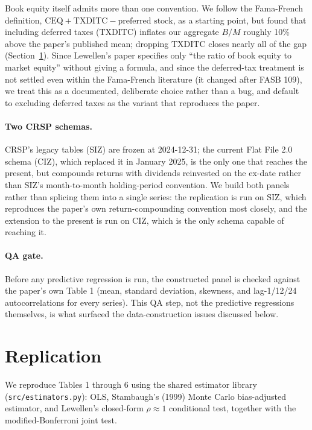 \documentclass[11pt]{article}
\begin{document}
Book equity itself admits more than one convention. We follow the
Fama-French definition, \(\text{CEQ} + \text{TXDITC} - \text{preferred
stock}\), as a starting point, but found that including deferred taxes
(\(\text{TXDITC}\)) inflates our aggregate \(B/M\) roughly 10\% above the
paper's published mean; dropping \(\text{TXDITC}\) closes nearly all of the
gap (Section~\ref{sec:replication}). Since Lewellen's paper specifies only
``the ratio of book equity to market equity'' without giving a formula, and
since the deferred-tax treatment is not settled even within the Fama-French
literature (it changed after FASB 109), we treat this as a documented,
deliberate choice rather than a bug, and default to excluding deferred
taxes as the variant that reproduces the paper.

\paragraph{Two CRSP schemas.} CRSP's legacy tables (SIZ) are frozen at
2024-12-31; the current Flat File 2.0 schema (CIZ), which replaced it in
January 2025, is the only one that reaches the present, but compounds
returns with dividends reinvested on the ex-date rather than SIZ's
month-to-month holding-period convention. We build both panels rather than
splicing them into a single series: the replication is run on SIZ, which
reproduces the paper's own return-compounding convention most closely, and
the extension to the present is run on CIZ, which is the only schema
capable of reaching it.

\paragraph{QA gate.} Before any predictive regression is run, the
constructed panel is checked against the paper's own Table 1 (mean,
standard deviation, skewness, and lag-1/12/24 autocorrelations for every
series). This QA step, not the predictive regressions themselves, is what
surfaced the data-construction issues discussed below.

\section{Replication}
\label{sec:replication}

We reproduce Tables 1 through 6 using the shared estimator library
(\texttt{src/estimators.py}): OLS, Stambaugh's (1999) Monte Carlo
bias-adjusted estimator, and Lewellen's closed-form \(\rho \approx 1\)
conditional test, together with the modified-Bonferroni joint test.
\end{document}

